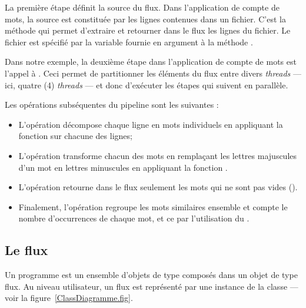 La premi\`ere \'etape d\'efinit la source du flux. Dans l'application de compte de mots, la source est constitu\'ee par les lignes contenues dans un fichier. C'est la m\'ethode  qui permet d'extraire et retourner dans le flux les lignes du fichier. Le fichier est sp\'ecifi\'e par la variable  fournie en argument \`a la m\'ethode . 

Dans notre exemple, la deuxi\`eme \'etape dans l'application de compte de mots est l'appel \`a . Ceci permet de partitionner les \'el\'ements du flux entre divers \emph{threads} --- ici, quatre (4) \emph{threads} --- et donc d'ex\'ecuter les \'etapes qui suivent en parall\`ele. 

Les op\'erations subs\'equentes du pipeline sont les suivantes :
\begin{itemize}

\item L'op\'eration  d\'ecompose chaque ligne en mots individuels en appliquant la fonction  sur chacune des lignes;

\item L'op\'eration  transforme chacun des mots en rempla\c{c}ant les lettres majuscules d'un mot en lettres minuscules en appliquant la fonction .

\item L'op\'eration  retourne dans le flux seulement les mots qui ne sont pas vides ().



\item Finalement, l'op\'eration   regroupe les mots similaires ensemble et compte le nombre d'occurrences de chaque mot, et ce par l'utilisation du  . 
\end{itemize}





\subsection{Le flux}


Un programme \PpFf{} est un ensemble d'objets de type  compos\'es dans un objet de type flux. Au niveau utilisateur, un flux est repr\'esent\'e par une instance de la classe  --- voir la figure~\ref{ClassDiagramme.fig}. 


